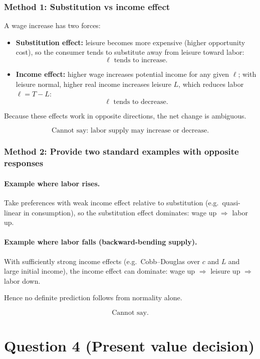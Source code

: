 \documentclass[12pt]{article}
\begin{document}
\subsubsection*{Method 1: Substitution vs income effect}
A wage increase has two forces:
\begin{itemize}[leftmargin=*]
\item \textbf{Substitution effect:} leisure becomes more expensive (higher opportunity cost), so the consumer tends to substitute away from leisure toward labor:
\[
\ell \text{ tends to increase}.
\]
\item \textbf{Income effect:} higher wage increases potential income for any given \(\ell\); with leisure normal, higher real income increases leisure \(L\), which reduces labor \(\ell=T-L\):
\[
\ell \text{ tends to decrease}.
\]
\end{itemize}
Because these effects work in opposite directions, the net change is ambiguous.

\[
\boxed{\text{Cannot say: labor supply may increase or decrease.}}
\]

\subsubsection*{Method 2: Provide two standard examples with opposite responses}
\paragraph{Example where labor rises.}
Take preferences with weak income effect relative to substitution (e.g.\ quasi-linear in consumption),
so the substitution effect dominates: wage up \(\Rightarrow\) labor up.

\paragraph{Example where labor falls (backward-bending supply).}
With sufficiently strong income effects (e.g.\ Cobb--Douglas over \(c\) and \(L\) and large initial income),
the income effect can dominate: wage up \(\Rightarrow\) leisure up \(\Rightarrow\) labor down.

Hence no definite prediction follows from normality alone.

\[
\boxed{\text{Cannot say.}}
\]

\newpage
\section*{Question 4 (Present value decision)}
\end{document}
